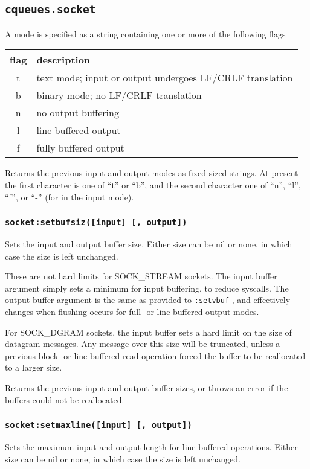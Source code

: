 \documentclass[11pt, oneside]{memoir}
\newcommand{\fn}[1]{\texttt{#1} }
\newcommand{\method}[1]{\texttt{#1} }
\newcounter{toccols}
\newenvironment{Module}[1]{
	\subsection{\texttt{#1}}
	\addtocontents{toc}{
		\protect\begin{multicols}{\value{toccols}}
	}
}{
	\addtocontents{toc}{\protect\end{multicols}}
}
\begin{document}
\begin{Module}{cqueues.socket}
A mode is specified as a string containing one or more of the following flags

\begin{tabular}{c | p{6in}}
flag & description \\\hline
t & text mode; input or output undergoes LF/CRLF translation \\
b & binary mode; no LF/CRLF translation \\
n & no output buffering \\
l & line buffered output \\
f & fully buffered output \\
\end{tabular}

Returns the previous input and output modes as fixed-sized strings. At present the first character is one of ``t'' or ``b'', and the second character one of ``n'', ``l'', ``f'', or ``-'' (for in the input mode).


\subsubsection[\fn{socket:setbufsiz}]{\fn{socket:setbufsiz([input] [, output])}}
Sets the input and output buffer size. Either size can be nil or none, in which case the size is left unchanged.

These are not hard limits for SOCK\_STREAM sockets. The input buffer argument simply sets a minimum for input buffering, to reduce syscalls. The output buffer argument is the same as provided to \method{:setvbuf}, and effectively changes when flushing occurs for full- or line-buffered output modes.

For SOCK\_DGRAM sockets, the input buffer sets a hard limit on the size of datagram messages. Any message over this size will be truncated, unless a previous block- or line-buffered read operation forced the buffer to be reallocated to a larger size.

Returns the previous input and output buffer sizes, or throws an error if the buffers could not be reallocated.

\subsubsection[\fn{socket:setmaxline}]{\fn{socket:setmaxline([input] [, output])}}
Sets the maximum input and output length for line-buffered operations. Either size can be nil or none, in which case the size is left unchanged.


\end{Module}
\end{document}
